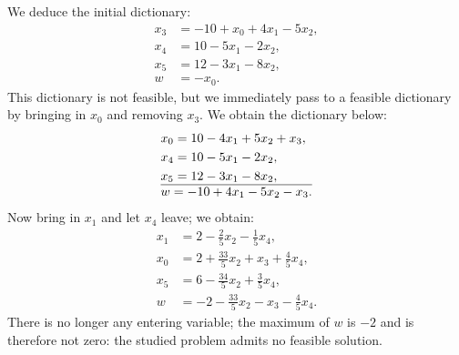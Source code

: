 \begin{example}
    We deduce the initial dictionary:
    \[
        \begin{aligned}
        x_3 &= -10 + x_0 + 4x_1 - 5x_2,\\
        x_4 &= 10 - 5x_1 - 2x_2,\\
        x_5 &= 12 - 3x_1 - 8x_2,\\
        \hline
        w &= -x_0.
        \end{aligned}
    \]
    This dictionary is not feasible, but we immediately pass to a feasible dictionary by bringing in \(x_0\) and removing \(x_3\). We obtain the dictionary below:
    \[
        \begin{aligned}
        &x_0 = 10 - 4x_1 + 5x_2 + x_3,\\
        &x_4 = 10 - 5x_1 - 2x_2,\\
        &x_5 = 12 - 3x_1 - 8x_2, \\
        \hline
        &w = -10 + 4x_1 - 5x_2 - x_3.
        \end{aligned}
    \]
    Now bring in \(x_1\) and let \(x_4\) leave; we obtain:
    \[
        \begin{aligned}
        x_1 &= 2 - \tfrac{2}{5}x_2 - \tfrac{1}{5}x_4,\\
        x_0 &= 2 + \tfrac{33}{5}x_2 + x_3 + \tfrac{4}{5}x_4,\\
        x_5 &= 6 - \tfrac{34}{5}x_2 + \tfrac{3}{5}x_4,\\
        \hline
        w &= -2 - \tfrac{33}{5}x_2 - x_3 - \tfrac{4}{5}x_4.
        \end{aligned}
    \]
    There is no longer any entering variable; the maximum of \(w\) is \(-2\) and is therefore not zero: the studied problem admits no feasible solution.
\end{example}

